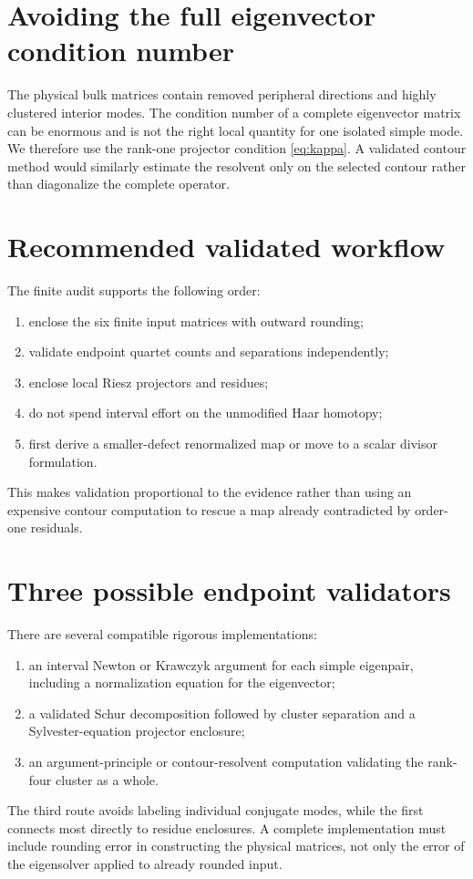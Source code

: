 \documentclass[12pt]{article}
\theoremstyle{remark}\newtheorem{remark}[theorem]{Remark}
\begin{document}
\section{Avoiding the full eigenvector condition number}

The physical bulk matrices contain removed peripheral directions and highly
clustered interior modes.  The condition number of a complete eigenvector
matrix can be enormous and is not the right local quantity for one isolated
simple mode.  We therefore use the rank-one projector condition
\eqref{eq:kappa}.  A validated contour method would similarly estimate the
resolvent only on the selected contour rather than diagonalize the complete
operator.

\section{Recommended validated workflow}

The finite audit supports the following order:
\begin{enumerate}[leftmargin=2em]
\item enclose the six finite input matrices with outward rounding;
\item validate endpoint quartet counts and separations independently;
\item enclose local Riesz projectors and residues;
\item do not spend interval effort on the unmodified Haar homotopy;
\item first derive a smaller-defect renormalized map or move to a scalar
divisor formulation.
\end{enumerate}
This makes validation proportional to the evidence rather than using an
expensive contour computation to rescue a map already contradicted by
order-one residuals.

\section{Three possible endpoint validators}

There are several compatible rigorous implementations:
\begin{enumerate}[leftmargin=2em]
\item an interval Newton or Krawczyk argument for each simple eigenpair,
including a normalization equation for the eigenvector;
\item a validated Schur decomposition followed by cluster separation and a
Sylvester-equation projector enclosure;
\item an argument-principle or contour-resolvent computation validating the
rank-four cluster as a whole.
\end{enumerate}
The third route avoids labeling individual conjugate modes, while the first
connects most directly to residue enclosures.  A complete implementation
must include rounding error in constructing the physical matrices, not only
the error of the eigensolver applied to already rounded input.
\end{document}

